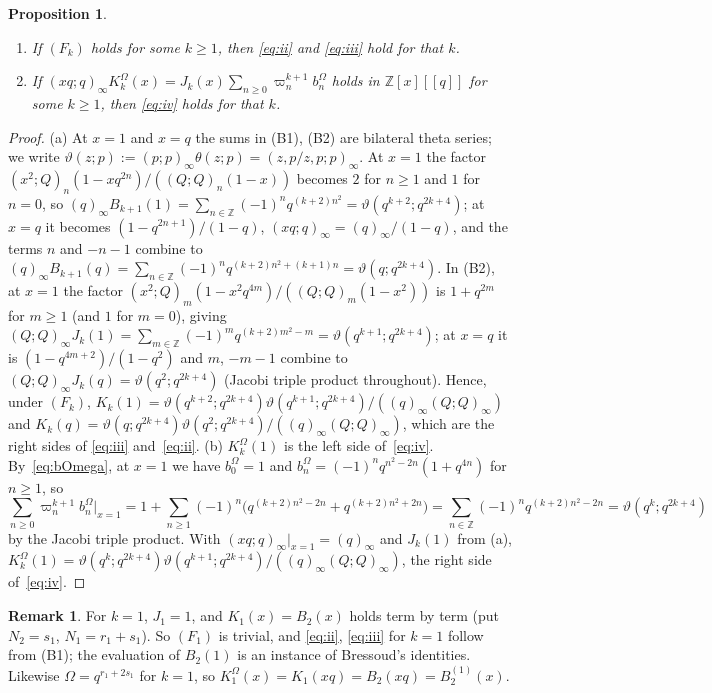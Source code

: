 \documentclass[11pt]{amsart}
\newtheorem{proposition}[theorem]{Proposition}
\theoremstyle{definition}
\newtheorem{remark}[theorem]{Remark}
\numberwithin{equation}{section}
\newcommand{\Z}{\mathbb{Z}}
\begin{document}
\begin{proposition}\label{prop:Fimplies}
\begin{enumerate}[label=(\alph*)]
\item If $(F_k)$ holds for some $k\ge1$, then \eqref{eq:ii} and \eqref{eq:iii} hold for that $k$.
\item If $(xq;q)_\infty K^\Omega_k(x)=J_k(x)\sum_{n\ge0}\varpi_n^{k+1}b^\Omega_n$ holds in $\Z[x][[q]]$ for some $k\ge1$,
then \eqref{eq:iv} holds for that $k$.
\end{enumerate}
\end{proposition}
\begin{proof}
(a) At $x=1$ and $x=q$ the sums in (B1), (B2) are bilateral theta series; we write
$\vartheta(z;p):=(p;p)_\infty\theta(z;p)=(z,p/z,p;p)_\infty$. At $x=1$ the factor $(x^2;Q)_n(1-xq^{2n})/((Q;Q)_n(1-x))$ becomes $2$ for
$n\ge1$ and $1$ for $n=0$, so $(q)_\infty B_{k+1}(1)=\sum_{n\in\Z}(-1)^nq^{(k+2)n^2}=\vartheta(q^{k+2};q^{2k+4})$; at
$x=q$ it becomes $(1-q^{2n+1})/(1-q)$, $(xq;q)_\infty=(q)_\infty/(1-q)$, and the terms $n$ and $-n-1$ combine
to $(q)_\infty B_{k+1}(q)=\sum_{n\in\Z}(-1)^nq^{(k+2)n^2+(k+1)n}=\vartheta(q;q^{2k+4})$. In (B2), at $x=1$ the
factor $(x^2;Q)_m(1-x^2q^{4m})/((Q;Q)_m(1-x^2))$ is $1+q^{2m}$ for $m\ge1$ (and $1$ for $m=0$), giving
$(Q;Q)_\infty J_k(1)=\sum_{m\in\Z}(-1)^mq^{(k+2)m^2-m}=\vartheta(q^{k+1};q^{2k+4})$; at $x=q$ it is
$(1-q^{4m+2})/(1-q^2)$ and $m$, $-m-1$ combine to $(Q;Q)_\infty J_k(q)=\vartheta(q^2;q^{2k+4})$ (Jacobi
triple product throughout). Hence, under $(F_k)$,
$K_k(1)=\vartheta(q^{k+2};q^{2k+4})\vartheta(q^{k+1};q^{2k+4})/((q)_\infty(Q;Q)_\infty)$ and
$K_k(q)=\vartheta(q;q^{2k+4})\vartheta(q^2;q^{2k+4})/((q)_\infty(Q;Q)_\infty)$, which are the right sides of
\eqref{eq:iii} and~\eqref{eq:ii}.
(b) $K^\Omega_k(1)$ is the left side of~\eqref{eq:iv}. By~\eqref{eq:bOmega}, at $x=1$ we have $b^\Omega_0=1$ and
$b^\Omega_n=(-1)^nq^{n^2-2n}(1+q^{4n})$ for $n\ge1$, so
\[
\sum_{n\ge0}\varpi_n^{k+1}b^\Omega_n\Big|_{x=1}=1+\sum_{n\ge1}(-1)^n\bigl(q^{(k+2)n^2-2n}+q^{(k+2)n^2+2n}\bigr)
=\sum_{n\in\Z}(-1)^nq^{(k+2)n^2-2n}=\vartheta(q^k;q^{2k+4})
\]
by the Jacobi triple product. With $(xq;q)_\infty|_{x=1}=(q)_\infty$ and $J_k(1)$ from (a),
$K^\Omega_k(1)=\vartheta(q^k;q^{2k+4})\vartheta(q^{k+1};q^{2k+4})/((q)_\infty(Q;Q)_\infty)$, the right side
of~\eqref{eq:iv}.
\end{proof}

\begin{remark}\label{rem:k1}
For $k=1$, $J_1=1$, and $K_1(x)=B_2(x)$ holds term by term (put $N_2=s_1$, $N_1=r_1+s_1$). So
$(F_1)$ is trivial, and \eqref{eq:ii}, \eqref{eq:iii} for $k=1$ follow from (B1); the evaluation of
$B_2(1)$ is an instance of Bressoud's identities. Likewise $\Omega=q^{r_1+2s_1}$ for $k=1$, so
$K^\Omega_1(x)=K_1(xq)=B_2(xq)=B^{(1)}_2(x)$.
\end{remark}
\end{document}
